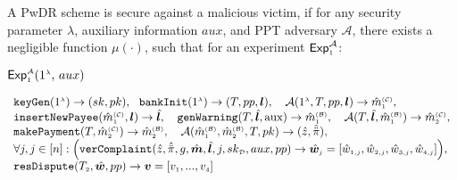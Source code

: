 \vspace{-2mm}
\begin{definition}\label{def-a::Security-against-malicious-victim} A PwDR scheme is secure against a malicious victim, if for any security parameter $\lambda$,  auxiliary information $aux$, and   PPT adversary $\mathcal{A}$, there exists a negligible function $\mu(\cdot)$, such that for an experiment $\mathsf{Exp}_{\scriptscriptstyle 1}^{\mathcal{A}}$:
%


\vspace{-2mm}
\begin{center}
\begin{mybox}[colback=white,  width=119mm, height=28mm, drop fuzzy shadow southwest]{$\mathsf{Exp}_{\scriptscriptstyle 1}^{\scriptscriptstyle\mathcal{A}}(1^{\scriptscriptstyle\lambda}\text{, }  
{aux})$}

\vspace{-1.6mm}
$$
  \begin{array}{l}
  
    \mathtt{keyGen}(1^{\st\lambda})\rightarrow (sk,pk),\ \
  
  
  \mathtt{bankInit}(1^{\st \lambda})\rightarrow (T, pp, \bm{l}), \ \ \
  
      \mathcal{A}( 1^{\st \lambda}, T, pp, \bm{l} )\rightarrow \hat m^{\st\mathcal{(C)}}_{\st 1}, \\
   
\mathtt{insertNewPayee}(\hat{m}^{\st\mathcal{(C)}}_{\st 1}, {\bm l})\rightarrow \hat{\bm l}, \ \ \

\mathtt{genWarning}(T, \hat{\bm l}, \text{aux})\rightarrow \hat m^{\st\mathcal{(B)}}_{\st1}, \ \ \



   \mathcal{A}(T,  \hat{\bm{l}}, \hat m^{\st\mathcal{(B)}}_{\st1})\rightarrow \hat m^{\st\mathcal{(C)}}_{\st2}, \\
   
   
   \mathtt{makePayment}(T, \hat m^{\st\mathcal{(C)}}_{\st2})\rightarrow \hat m^{\st\mathcal{(B)}}_{\st2}, \ \ \
   


  
\mathcal{A}(\hat m^{\st\mathcal{(B)}}_{\st 1}, \hat m^{\st\mathcal{(B)}}_{\st2}, T, pk)\rightarrow (\hat z, \hat{\ddot \pi}),\\


 \forall j, j\in [n]:
\Big(\mathtt{verComplaint}( \hat z, \hat{\ddot{\pi}}, g, \hat{\bm{m}}, \hat{\bm{l}}, j, sk_{\st\mathcal D}, aux, pp)\rightarrow \hat{\bm{w}}_{\st j}= [\hat w_{\st 1,j}, \hat w_{\st 2, j}, \hat w_{\st 3, j}, \hat w_{\st 4, j}]\Big), \\
\mathtt{resDispute}(T_{\st 2}, \hat {\bm w}, pp)\rightarrow \bm v=[v_{\st 1},..., v_{\st 4}]
   \end{array} 
$$
\end{mybox}
%
\end{center}


\end{definition}
